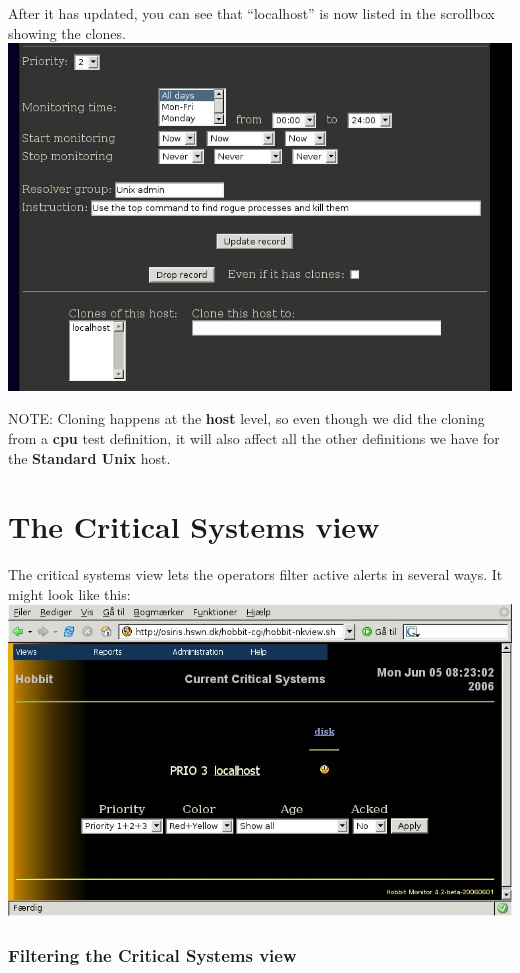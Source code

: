  After it has updated, you can see that ``localhost'' is now listed in the scrollbox showing the clones.\\ 
\includegraphics[scale=1]{./editor-showclone.png} 


 NOTE: Cloning happens at the \textbf{host}
 level, so even though we did the cloning from a \textbf{cpu}
 test definition, it will also affect all the other definitions we have for the \textbf{Standard Unix}
 host.
\section*{The Critical Systems view}


 The critical systems view lets the operators filter active alerts in several ways. It might look like this:\\ 
\includegraphics[scale=1]{./critview-disk.png} 
\subsubsection*{Filtering the Critical Systems view}


